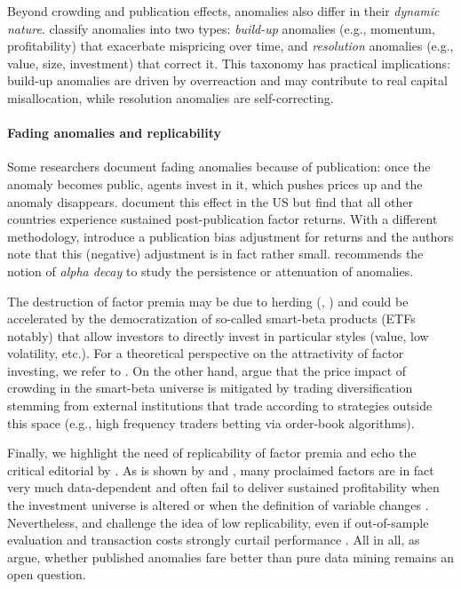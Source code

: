 Beyond crowding and publication effects, anomalies also differ in their \textit{dynamic nature}. \cite{vanbinsbergen2023dynamic} classify anomalies into two types: \textit{build-up} anomalies (e.g., momentum, profitability) that exacerbate mispricing over time, and \textit{resolution} anomalies (e.g., value, size, investment) that correct it. This taxonomy has practical implications: build-up anomalies are driven by overreaction and may contribute to real capital misallocation, while resolution anomalies are self-correcting.

\paragraph{Fading anomalies and replicability}

Some researchers document fading anomalies because of publication: once the anomaly becomes public, agents invest in it, which pushes prices up and the anomaly disappears. \cite{mclean2016does} document this effect in the US but \cite{jacobs2019anomalies} find that all other countries experience sustained post-publication factor returns. With a different methodology, \cite{chen2020publication} introduce a publication bias adjustment for returns and the authors note that this (negative) adjustment is in fact rather small. \cite{penasse2018understanding} recommends the notion of \textit{alpha decay} to study the persistence or attenuation of anomalies.

The destruction of factor premia may be due to herding (\cite{krkoska2019herding}, \cite{volpati2020zooming}) and could be accelerated by the democratization of so-called smart-beta products (ETFs notably) that allow investors to directly invest in particular styles (value, low volatility, etc.). For a theoretical perspective on the attractivity of factor investing, we refer to \cite{jin2019drivers}. On the other hand, \cite{demiguel2019crowding} argue that the price impact of crowding in the smart-beta universe is mitigated by trading diversification stemming from external institutions that trade according to strategies outside this space (e.g., high frequency traders betting via order-book algorithms).

Finally, we highlight the need of replicability of factor premia and echo the critical editorial by \cite{harvey2019evaluation}. As is shown by \cite{linnainmaa2018history} and \cite{hou2019replicating}, many proclaimed factors are in fact very much data-dependent and often fail to deliver sustained profitability when the investment universe is altered or when the definition of variable changes \citep{asness2013devil}. Nevertheless, \cite{chen2020publication} and \cite{chen2021open} challenge the idea of low replicability, even if out-of-sample evaluation and transaction costs strongly curtail performance \citep{chen2020zeroing}. All in all, as \cite{chen2024does} argue, whether published anomalies fare better than pure data mining remains an open question.

